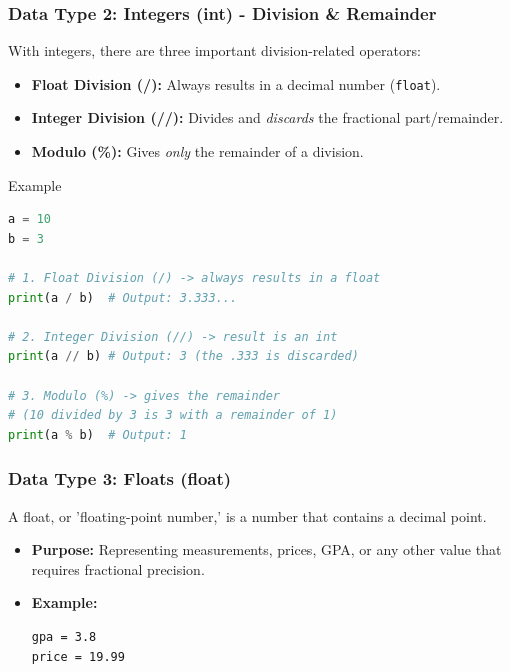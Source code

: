 \documentclass{beamer}
\begin{document}
\begin{frame}[fragile]
    \frametitle{Data Type 2: Integers (int) - Division \& Remainder}

    With integers, there are three important division-related operators:
    \begin{itemize}
        \item \textbf{Float Division (/):} Always results in a decimal number (\texttt{float}).
        \item \textbf{Integer Division (//):} Divides and \textit{discards} the fractional part/remainder.
        \item \textbf{Modulo (\%):} Gives \textit{only} the remainder of a division.
    \end{itemize}

    \begin{block}{Example}
        \begin{lstlisting}[language=Python]
a = 10
b = 3

# 1. Float Division (/) -> always results in a float
print(a / b)  # Output: 3.333...

# 2. Integer Division (//) -> result is an int
print(a // b) # Output: 3 (the .333 is discarded)

# 3. Modulo (%) -> gives the remainder
# (10 divided by 3 is 3 with a remainder of 1)
print(a % b)  # Output: 1
        \end{lstlisting}
    \end{block}
\end{frame}

\begin{frame}[fragile]
    \frametitle{Data Type 3: Floats (float)}
    
    A float, or 'floating-point number,' is a number that contains a decimal point.
    
    \begin{itemize}
        \item \textbf{Purpose:} Representing measurements, prices, GPA, or any other value that requires fractional precision.
        
        \item \textbf{Example:}
        \begin{lstlisting}
gpa = 3.8
price = 19.99
        \end{lstlisting}
    \end{itemize}
    
\end{frame}
\end{document}
